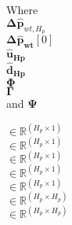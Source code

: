 \begin{minipage}[t]{0.15\textwidth}
Where\\
\hspace*{8mm} $\bm{\Delta \hat{p}}_{wt,H_p} $ \\\newline
\hspace*{8mm} $\bm{\Delta \hat{p}}_{\bm{wt}}[0] $ \\\newline
\hspace*{8mm} $\bm{\hat{u}_{\bm{Hp}}}$ \\\newline
\hspace*{8mm} $\bm{\hat{d}_{\bm{Hp}}}$ \\\newline
\hspace*{8mm} $\bm{\Phi}$ \\\newline
\hspace*{8mm} $\bm{\Gamma}$ \\\newline
and \hspace*{0.7mm} $\bm{\Psi} $ 
\end{minipage}
\begin{minipage}[t]{0.13\textwidth}
\vspace*{2mm}
$\in \pmb{\mathbb{R}}^{(H_p \times 1)}$ \\\newline
$\in \pmb{\mathbb{R}}^{(H_p \times 1)}$ \\\newline
$\in \pmb{\mathbb{R}}^{(H_p \times 1)}$ \\\newline
$\in \pmb{\mathbb{R}}^{(H_p \times 1)}$ \\\newline
$\in \pmb{\mathbb{R}}^{(H_p \times 1)}$ \\\newline
$\in \pmb{\mathbb{R}}^{(H_p \times H_p)}$ \\\newline
$\in \pmb{\mathbb{R}}^{(H_p \times H_p)}$ 
\end{minipage}
